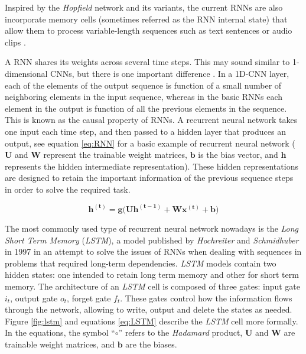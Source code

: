 Inspired by the \textit{Hopfield} network and its variants, the current RNNs are also incorporate memory cells (sometimes referred as the RNN internal state) that allow them to process variable-length sequences such as text sentences or audio clips \cite{haykin1998}. 

A RNN shares its weights across several time steps. This may sound similar to 1-dimensional CNNs, but there is one important difference \cite{Goodfellow2016}. In a 1D-CNN layer, each of the elements of the output sequence is function of a small number of neighboring elements in the input sequence, whereas in the basic RNNs each element in the output is function of all the previous elements in the sequence. This is known as the causal property of RNNs. A recurrent neural network takes one input each time step, and then passed to a hidden layer that produces an output, see equation \ref{eq:RNN} for a basic example of recurrent neural network ($\mathbf{U}$ and $\mathbf{W}$ represent the trainable weight matrices, $\mathbf{b}$ is the bias vector, and $\mathbf{h}$ represents the hidden intermediate representation). These hidden representations are designed to retain the important information of the previous sequence steps in order to solve the required task.

\begin{equation}
\label{eq:RNN}
\mathbf{h^{( t )}} = \mathbf{g(U h^{( t-1 )}} + \mathbf{W x^{( t )}} + \mathbf{b})
\end{equation}

The most commonly used type of recurrent neural network nowadays is the \textit{Long Short Term Memory} (\textit{LSTM}), a model published by  \textit{Hochreiter} and \textit{Schmidhuber} in 1997 \cite{Schmidhuber1997} in an attempt to solve the issues of RNNs when dealing with sequences in problems that required long-term dependencies. \textit{LSTM} models contain two hidden states: one intended to retain long term memory and other for short term memory. The architecture of an \textit{LSTM} cell is composed of three gates: input gate $i_t$, output gate $o_t$, forget gate $f_t$. These gates control how the information flows through the network, allowing to write, output and delete the states as needed. Figure \ref{fig:lstm} and equations \ref{eq:LSTM} describe the \textit{LSTM} cell more formally. In the equations, the symbol ``$\circ$'' refers to the \textit{Hadamard} product, $\mathbf{U}$ and $\mathbf{W}$ are trainable weight matrices, and $\mathbf{b}$ are the biases. 

